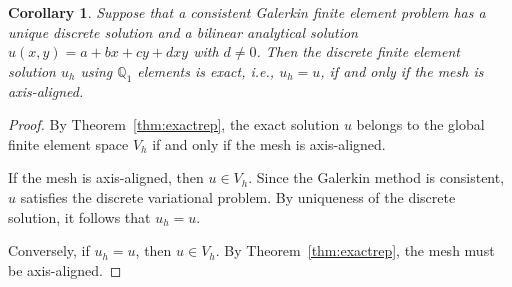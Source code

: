 \documentclass[a4paper]{article}
\theoremstyle{plain}
\newtheorem{corollary}[lemma]{Corollary}
\theoremstyle{definition}
\theoremstyle{remark}
\begin{document}
\begin{corollary}\label{Cor:GalerkinExact}
Suppose that a consistent Galerkin finite element problem has a unique discrete solution and a bilinear analytical solution
$u(x,y) = a+bx+cy+dxy$ with $d\neq 0$. Then the discrete finite element solution $u_h$ using $\mathbb{Q}_1$ elements is exact, i.e., $u_h=u$, if and only if the mesh is axis-aligned.
\end{corollary}

\begin{proof}
By Theorem~\ref{thm:exactrep}, the exact solution $u$ belongs to the global finite element space $V_h$ if and only if the mesh is axis-aligned.

If the mesh is axis-aligned, then $u\in V_h$. Since the Galerkin method is consistent, $u$ satisfies the discrete variational problem. By uniqueness of the discrete solution, it follows that $u_h=u.$

Conversely, if $u_h=u$, then $u\in V_h$. By Theorem~\ref{thm:exactrep}, the mesh must be axis-aligned.
\end{proof}
\end{document}
